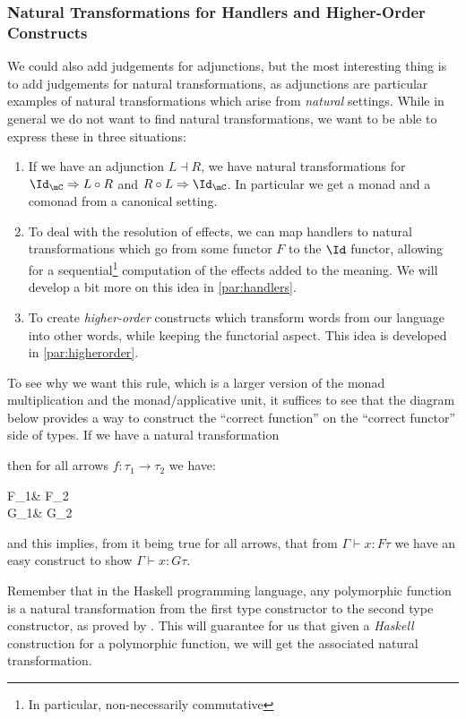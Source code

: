 \documentclass[math, english, info]{cours}
\def\cont{\Gamma\vdash}
\begin{document}
\subsubsection{Natural Transformations for Handlers and Higher-Order Constructs}\label{subsubsec:transnat}
We could also add judgements for adjunctions, but the most interesting thing is to add judgements for natural transformations, as adjunctions are particular examples of natural transformations which arise from \emph{natural} settings.
While in general we do not want to find natural transformations, we want to be able to express these in three situations:
\begin{enumerate}
	\item If we have an adjunction $L\dashv R$, we have natural transformations for $\Id_{\mC} \Rightarrow L \circ R$ and $R\circ L \Rightarrow \Id_{\mC}$.
		In particular we get a monad and a comonad from a canonical setting.
	\item To deal with the resolution of effects, we can map handlers to natural transformations which go from some functor $F$ to the $\Id$ functor, allowing for a sequential\footnote{In particular, non-necessarily commutative} computation of the effects added to the meaning.
		We will develop a bit more on this idea in \ref{par:handlers}.
	\item To create \emph{higher-order} constructs which transform words from our language into other words, while keeping the functorial aspect.
		This idea is developed in \ref{par:higherorder}.
\end{enumerate}
To see why we want this rule, which is a larger version of the monad multiplication and the monad/applicative unit, it suffices to see that the diagram below provides a way to construct the ``correct function'' on the ``correct functor'' side of types. If we have a natural transformation  then for all arrows $f: \tau_{1} \to \tau_{2}$ we have:
\begin{category}
	F\tau_{1}\ar[r, "Ff"] & F\tau_{2}\\
	G\tau_{1}\ar[r, "Gf"] & G\tau_{2}
\end{category}
and this implies, from it being true for all arrows, that from $\cont x: F\tau$ we have an easy construct to show $\cont x: G\tau$.

Remember that in the Haskell programming language, any polymorphic function is a natural transformation from the first type constructor to the second type constructor, as proved by .
This will guarantee for us that given a \emph{Haskell} construction for a polymorphic function, we will get the associated natural transformation.
\end{document}
